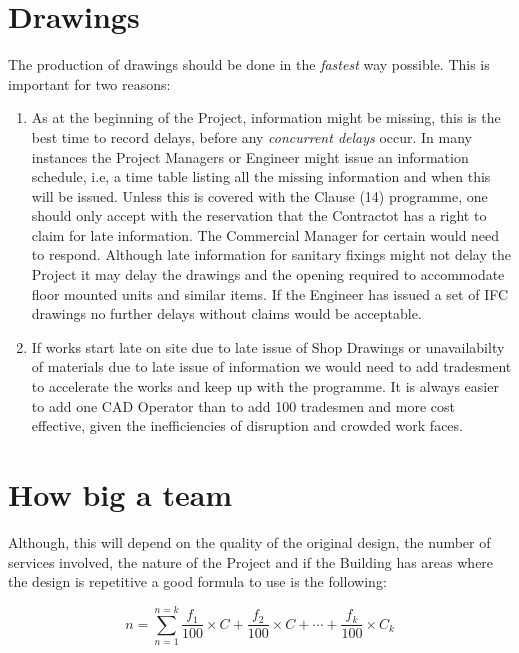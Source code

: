\section*{Drawings}

The production of drawings should be done in the \textit{fastest} way possible. 
This is important for two reasons:

\begin{enumerate}
\item As at the beginning of the Project, information might be missing, this is
the best time to record delays, before any \textit{concurrent delays} occur. In many instances the Project Managers or Engineer might issue an information schedule, i.e, a time table listing all the missing information and when this will be issued. Unless this is covered with the Clause (14) programme, one should only accept with the reservation that the Contractot has a right to claim for late information. The Commercial Manager for certain would need to respond. Although
late information for sanitary fixings might not delay the Project it may delay the
drawings and the opening required to accommodate floor mounted units and similar items. If the Engineer has issued a set of IFC drawings no further delays without claims would be acceptable.
\item If works start late on site due to late issue of Shop Drawings or unavailabilty of materials due to late issue of information we would need to add
tradesment to accelerate the works and keep up with the programme. It is always easier to add one CAD Operator than to add 100 tradesmen and more cost effective, given the inefficiencies of disruption and crowded work faces.

\end{enumerate}

\section*{How big a team}

Although, this will depend on the quality of the original design, the number of services involved, the nature of the Project and if the Building has areas where
the design is repetitive a good formula to use is the following:

\begin{equation} n = \sum_{n=1}^{n=k}\frac{f_1}{100}\times C + \frac{f_2}{100}\times C +\cdots+\frac{f_k}{100}\times C_k
\end{equation}

